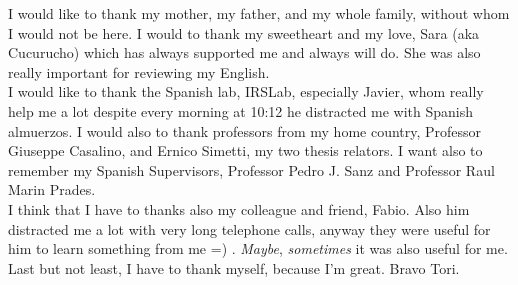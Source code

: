 

\begin{acknowledgements}

I would like to thank my mother, my father, and my whole family, without whom I would not be here. I would to thank my sweetheart and my love, Sara (aka Cucurucho) which has always supported me and always will do. She was also really important for reviewing my English.\\
I would like to thank the Spanish lab, IRSLab, especially Javier, whom really help me a lot despite every morning at 10:12 he distracted me with Spanish almuerzos. I would also to thank professors from my home country, Professor Giuseppe Casalino, and Ernico Simetti, my two thesis relators. I want also to remember my Spanish Supervisors, Professor Pedro J. Sanz and Professor Raul Marin Prades.\\
I think that I have to thanks also my colleague and friend, Fabio. Also him distracted me a lot with very long telephone calls, anyway they were useful for him to learn something from me =) . \textit{Maybe}, \textit{sometimes} it was also useful for me.\\
Last but not least, I have to thank myself, because I'm great. Bravo Tori.


\end{acknowledgements}
